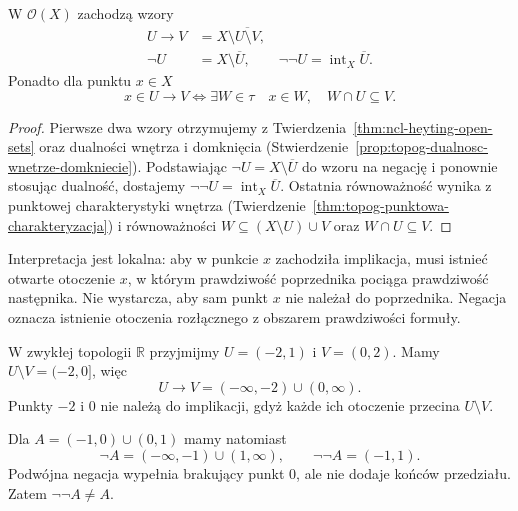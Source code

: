 \begin{stwierdzenie}
\label{prop:ncl-heyting-topological-implication}
W $\mathcal O(X)$ zachodzą wzory
\[
\begin{aligned}
 U\to V&=X\setminus\overline{U\setminus V},\\
 \neg U&=X\setminus\overline U,\qquad
 \neg\neg U=\operatorname{int}_X\overline U.
\end{aligned}
\]
Ponadto dla punktu $x\in X$
\[
 x\in U\to V
 \iff
 \exists W\in\tau\quad x\in W,\quad W\cap U\subseteq V.
\]
\end{stwierdzenie}
\begin{proof}
Pierwsze dwa wzory otrzymujemy z
Twierdzenia~\ref{thm:ncl-heyting-open-sets}
oraz dualności wnętrza i domknięcia
(Stwierdzenie~\ref{prop:topog-dualnosc-wnetrze-domkniecie}).
Podstawiając $\neg U=X\setminus\overline U$
do wzoru na negację i ponownie stosując dualność,
dostajemy $\neg\neg U=\operatorname{int}_X\overline U$.
Ostatnia równoważność wynika z punktowej
charakterystyki wnętrza
(Twierdzenie~\ref{thm:topog-punktowa-charakteryzacja})
i równoważności
$W\subseteq(X\setminus U)\cup V$
oraz $W\cap U\subseteq V$.
\end{proof}

Interpretacja jest lokalna: aby w punkcie $x$
zachodziła implikacja, musi istnieć otwarte
otoczenie $x$, w którym prawdziwość poprzednika
pociąga prawdziwość następnika.
Nie wystarcza, aby sam punkt $x$ nie należał
do poprzednika. Negacja oznacza istnienie
otoczenia rozłącznego z obszarem prawdziwości
formuły.

\begin{przyklad}
\label{ex:ncl-heyting-real-open-sets}
W zwykłej topologii $\mathbb R$ przyjmijmy
$U=(-2,1)$ i $V=(0,2)$.
Mamy $U\setminus V=(-2,0]$, więc
\[
 U\to V=(-\infty,-2)\cup(0,\infty).
\]
Punkty $-2$ i $0$ nie należą do implikacji,
gdyż każde ich otoczenie przecina $U\setminus V$.

Dla $A=(-1,0)\cup(0,1)$ mamy natomiast
\[
 \neg A=(-\infty,-1)\cup(1,\infty),\qquad
 \neg\neg A=(-1,1).
\]
Podwójna negacja wypełnia brakujący punkt $0$,
ale nie dodaje końców przedziału.
Zatem $\neg\neg A\ne A$.
\end{przyklad}

